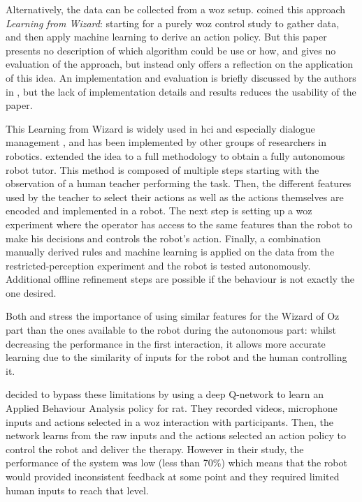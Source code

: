     Alternatively, the data can be collected from a \acrlong{woz} setup. \cite{knox2014learning} coined this approach \emph{Learning from Wizard}: starting for a purely \gls{woz} control study to gather data, and then apply machine learning to derive an action policy. But this paper presents no description of which algorithm could be use or how, and gives no evaluation of the approach, but instead only offers a reflection on the application of this idea. An implementation and evaluation is briefly discussed by the authors in \cite{knox2016learning}, but the lack of implementation details and results reduces the usability of the paper.
    
    This Learning from Wizard is widely used in \gls{hci} and especially dialogue management \citep{rieser2008learning}, and has been implemented by other groups of researchers in robotics. \citet{sequeira2016discovering} extended the idea to a full methodology to obtain a fully autonomous robot tutor. This method is composed of multiple steps starting with the observation of a human teacher performing the task. Then, the different features used by the teacher to select their actions as well as the actions themselves are encoded and implemented in a robot. The next step is setting up a \gls{woz} experiment where the operator has access to the same features than the robot to make his decisions and controls the robot's action. Finally, a combination manually derived rules and machine learning is applied on the data from the restricted-perception experiment and the robot is tested autonomously. Additional offline refinement steps are possible if the behaviour is not exactly the one desired. 
    
    Both \citet{knox2014learning} and \citet{sequeira2016discovering} stress the importance of using similar features for the Wizard of Oz part than the ones available to the robot during the autonomous part: whilst decreasing the performance in the first interaction, it allows more accurate learning due to the similarity of inputs for the robot and the human controlling it.
        
    \cite{clark2018deep} decided to bypass these limitations by using a deep Q-network \citep{mnih2015human} to learn an Applied Behaviour Analysis policy for \gls{rat}. They recorded videos, microphone inputs and actions selected in a \gls{woz} interaction with participants. Then, the network learns from the raw inputs and the actions selected an action policy to control the robot and deliver the therapy. However in their study, the performance of the system was low (less than 70\%) which means that the robot would provided inconsistent feedback at some point and they required limited human inputs to reach that level. 
     
